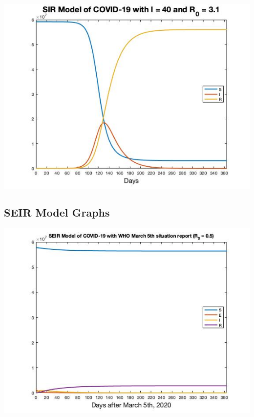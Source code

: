 \documentclass[12pt, a4paper]{article}
\begin{document}
    \includegraphics[scale=0.75]{plots/infect40(3.1).jpg}

    \subsection{SEIR Model Graphs}
    
    
        
        
        
        
            
    
    \includegraphics[scale=0.75]{plots/whoseir5.jpg}
    
\end{document}
